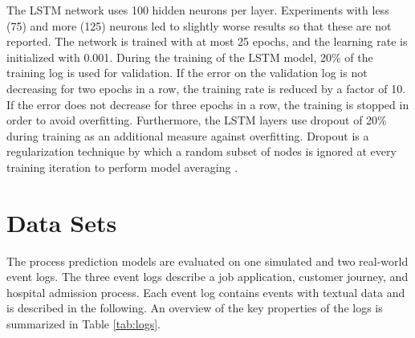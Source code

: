 The LSTM network uses 100 hidden neurons per layer.
Experiments with less (75) and more (125) neurons led to slightly worse results so that these are not reported.
The network is trained with at most 25 epochs, and the learning rate is initialized with 0.001.
During the training of the LSTM model, 20\% of the training log is used for validation.
If the error on the validation log is not decreasing for two epochs in a row, the training rate is reduced by a factor of 10.
If the error does not decrease for three epochs in a row, the training is stopped in order to avoid overfitting.
Furthermore, the LSTM layers use dropout of 20\% during training as an additional measure against overfitting.
Dropout is a regularization technique by which a random subset of nodes is ignored at every training iteration to perform model averaging \cite{DBLP:journals/corr/abs-1207-0580}.


\section{Data Sets}

The process prediction models are evaluated on one simulated and two real-world event logs.
The three event logs describe a job application, customer journey, and hospital admission process.
Each event log contains events with textual data and is described in the following.
An overview of the key properties of the logs is summarized in Table \ref{tab:logs}.


